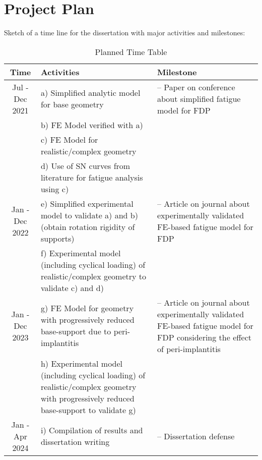 \section{Project Plan}
\label{sec:plan}

Sketch of a time line for the dissertation with major activities and milestones:

\begin{table}[h!]
    \centering
    \begin{tabular}{ | c | m{} | m{} | }
        \hline
        \textbf{Time} & \textbf{Activities} & \textbf{Milestone} \\
        \hline
         Jul - Dec 2021	& a) Simplified analytic model for base geometry & -- Paper on conference about simplified fatigue model for \ac{FDP}\\
					    & b) \ac{FE} Model verified with a) &\\
                  		& c) \ac{FE} Model for realistic/complex geometry &\\
                  		& d) Use of \ac{SN} curves from literature for fatigue analysis using c) &\\
        \hline
         Jan - Dec 2022 & e) Simplified experimental model to validate a) and b) (obtain rotation rigidity of supports) 	& -- Article on journal about experimentally validated \ac{FE}-based fatigue model for \ac{FDP}\\
						& f) Experimental model (including cyclical loading) of realistic/complex geometry to validate c) and d) &\\
        \hline
        Jan  - Dec 2023 & g) \ac{FE} Model for geometry with progressively reduced base-support due to peri-implantitis & -- Article on journal about experimentally validated \ac{FE}-based fatigue model for \ac{FDP} considering the effect of peri-implantitis\\
						& h) Experimental model (including cyclical loading) of realistic/complex geometry with progressively reduced base-support to validate g)  &\\
        \hline
         Jan - Apr 2024	& i) Compilation of results and dissertation writing & -- Dissertation defense \\
        \hline
    \end{tabular}
    \label{tab:time-table}
    \caption{Planned Time Table}
\end{table}